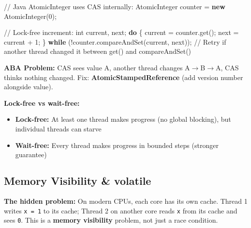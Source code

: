 \documentclass[11pt]{article}
\providecommand{\tightlist}{\setlength{\itemsep}{1pt}\setlength{\parskip}{0pt}}
\newenvironment{Shaded}{\begin{snugshade}}{\end{snugshade}}
\newcommand{\BuiltInTok}[1]{\textcolor[rgb]{0.50,0.55,0.55}{#1}}
\newcommand{\CommentTok}[1]{\textcolor[rgb]{0.48,0.49,0.49}{#1}}
\newcommand{\ControlFlowTok}[1]{\textcolor[rgb]{0.99,0.74,0.29}{\textbf{#1}}}
\newcommand{\DataTypeTok}[1]{\textcolor[rgb]{0.16,0.50,0.73}{#1}}
\newcommand{\DecValTok}[1]{\textcolor[rgb]{0.96,0.45,0.00}{#1}}
\newcommand{\FunctionTok}[1]{\textcolor[rgb]{0.56,0.27,0.68}{#1}}
\newcommand{\KeywordTok}[1]{\textcolor[rgb]{0.81,0.81,0.76}{\textbf{#1}}}
\newcommand{\NormalTok}[1]{\textcolor[rgb]{0.81,0.81,0.76}{#1}}
\newcommand{\OperatorTok}[1]{\textcolor[rgb]{0.81,0.81,0.76}{#1}}
\begin{document}

\begin{Shaded}
\begin{Highlighting}[]
\CommentTok{// Java AtomicInteger uses CAS internally:}
\BuiltInTok{AtomicInteger}\NormalTok{ counter }\OperatorTok{=} \KeywordTok{new} \BuiltInTok{AtomicInteger}\OperatorTok{(}\DecValTok{0}\OperatorTok{);}

\CommentTok{// Lock{-}free increment:}
\DataTypeTok{int}\NormalTok{ current}\OperatorTok{,}\NormalTok{ next}\OperatorTok{;}
\ControlFlowTok{do} \OperatorTok{\{}
\NormalTok{    current }\OperatorTok{=}\NormalTok{ counter}\OperatorTok{.}\FunctionTok{get}\OperatorTok{();}
\NormalTok{    next }\OperatorTok{=}\NormalTok{ current }\OperatorTok{+} \DecValTok{1}\OperatorTok{;}
\OperatorTok{\}} \ControlFlowTok{while} \OperatorTok{(!}\NormalTok{counter}\OperatorTok{.}\FunctionTok{compareAndSet}\OperatorTok{(}\NormalTok{current}\OperatorTok{,}\NormalTok{ next}\OperatorTok{));}
\CommentTok{// Retry if another thread changed it between get() and compareAndSet()}
\end{Highlighting}
\end{Shaded}

\textbf{ABA Problem:} CAS sees value A, another thread changes A\(\rightarrow\)B\(\rightarrow\)A, CAS thinks nothing changed. Fix: \textbf{AtomicStampedReference} (add version number alongside value).

\textbf{Lock-free vs wait-free:}

\begin{itemize}
\tightlist
\item
  \textbf{Lock-free:} At least one thread makes progress (no global blocking), but individual threads can starve
\item
  \textbf{Wait-free:} Every thread makes progress in bounded steps (stronger guarantee)
\end{itemize}

\subsection{Memory Visibility \& volatile}\label{memory-visibility--volatile}

\textbf{The hidden problem:} On modern CPUs, each core has its own cache. Thread 1 writes \texttt{x\ =\ 1} to its cache; Thread 2 on another core reads \texttt{x} from its cache and sees \texttt{0}. This is a \textbf{memory visibility} problem, not just a race condition.
\end{document}
